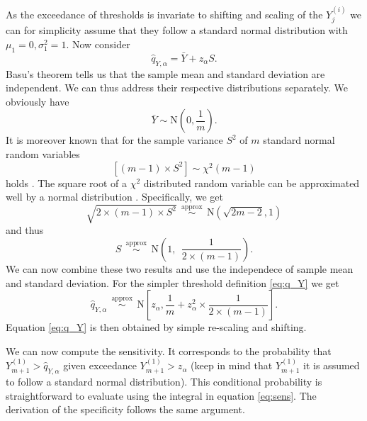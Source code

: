 \documentclass[12pt]{article}
\begin{document}
As the exceedance of thresholds is invariate to shifting and scaling of the $Y^{(i)}_j$ we can for simplicity assume that they follow a standard normal distribution with $\mu_1 = 0, \sigma^2_1 = 1$. Now consider
$$
\hat{q}_{Y, \alpha} = \bar{Y} + z_\alpha S.
$$
Basu's theorem tells us that the sample mean and standard deviation are independent. We can thus  address their respective distributions separately. We obviously have
$$
\bar{Y} \sim \text{N}\left(0, \frac{1}{m}\right).
$$
It is moreover known that for the sample variance $S^2$ of $m$ standard normal random variables
$$
[(m - 1) \times S^2] \sim \chi^2(m - 1)
$$
holds \citep{HELM2008}. The square root of a $\chi^2$ distributed random variable can be approximated well by a normal distribution \citep[p426]{Johnson1994}. Specifically, we get
$$
\sqrt{2 \times (m - 1) \times S^2} \ \  \stackrel{\text{approx}}{\sim} \ \ \text{N}(\sqrt{2m - 2}, 1)
$$
and thus
$$
S \ \  \stackrel{\text{approx}}{\sim} \ \ \text{N}\left(1, \ \ \frac{1}{2\times(m - 1)}\right).
$$
We can now combine these two results and use the independece of sample mean and standard deviation. For the simpler threshold definition \eqref{eq:q_Y} we get
$$
\hat{q}_{Y, \alpha} \ \  \stackrel{\text{approx}}{\sim} \ \ \text{N}\left[z_\alpha, \frac{1}{m} + z_\alpha^2 \times \frac{1}{2 \times (m - 1)} \right].
$$
Equation \eqref{eq:q_Y} is then obtained by simple re-scaling and shifting.

We can now compute the sensitivity. It corresponds to the probability that $Y^{(1)}_{m + 1} > \hat{q}_{Y, \alpha}$ given exceedance $Y^{(1)}_{m + 1} > z_\alpha$ (keep in mind that $Y^{(1)}_{m + 1}$ it is assumed to follow a standard normal distribution). This conditional probability is straightforward to evaluate using the integral in equation \eqref{eq:sens}. The derivation of the specificity follows the same argument.
\end{document}
